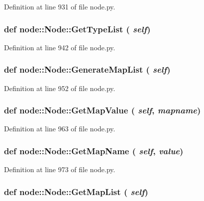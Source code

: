 Definition at line 931 of file node.py.\hypertarget{classnode_1_1Node_d8158864eb6cd18998f9d9d302b37780}{
\subsubsection[GetTypeList]{\setlength{\rightskip}{0pt plus 5cm}def node::Node::Get\-Type\-List ( {\em self})}}
\label{classnode_1_1Node_d8158864eb6cd18998f9d9d302b37780}




Definition at line 942 of file node.py.\hypertarget{classnode_1_1Node_c288a6a6ed8ac92aa09d50d926f9715d}{
\subsubsection[GenerateMapList]{\setlength{\rightskip}{0pt plus 5cm}def node::Node::Generate\-Map\-List ( {\em self})}}
\label{classnode_1_1Node_c288a6a6ed8ac92aa09d50d926f9715d}




Definition at line 952 of file node.py.\hypertarget{classnode_1_1Node_375969d6edbee5a276b215498a4e6f6c}{
\subsubsection[GetMapValue]{\setlength{\rightskip}{0pt plus 5cm}def node::Node::Get\-Map\-Value ( {\em self},  {\em mapname})}}
\label{classnode_1_1Node_375969d6edbee5a276b215498a4e6f6c}




Definition at line 963 of file node.py.\hypertarget{classnode_1_1Node_df42241bdf3a60d71a6e946b20efb4d8}{
\subsubsection[GetMapName]{\setlength{\rightskip}{0pt plus 5cm}def node::Node::Get\-Map\-Name ( {\em self},  {\em value})}}
\label{classnode_1_1Node_df42241bdf3a60d71a6e946b20efb4d8}




Definition at line 973 of file node.py.\hypertarget{classnode_1_1Node_7531642c9fff692807ae7389474089aa}{
\subsubsection[GetMapList]{\setlength{\rightskip}{0pt plus 5cm}def node::Node::Get\-Map\-List ( {\em self})}}
\label{classnode_1_1Node_7531642c9fff692807ae7389474089aa}





